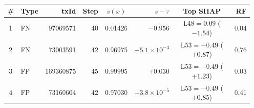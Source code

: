 \begin{tabular}{@{}clrrcrcr@{}}
\toprule
\# & Type & txId & Step & $s(x)$ & $s-\tau$ & Top SHAP & RF \\
\midrule
1 & FN & 97069571 & 40 & 0.01426 & $-0.956$ & L48$=0.09$ ($-1.54$) & 0.04 \\
2 & FN & 73003591 & 42 & 0.96975 & $-5.1{\times}10^{-4}$ & L53$=-0.49$ ($+0.87$) & 0.76 \\
3 & FP & 169360875 & 45 & 0.99995 & $+0.030$ & L53$=-0.49$ ($+1.23$) & 0.03 \\
4 & FP & 73160604 & 42 & 0.97030 & $+3.8{\times}10^{-5}$ & L53$=-0.49$ ($+0.85$) & 0.41 \\
\bottomrule
\end{tabular}
